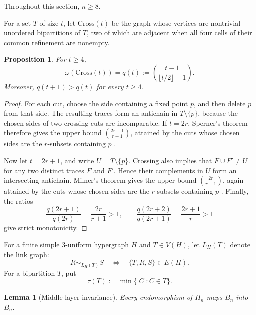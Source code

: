\documentclass[11pt]{article}
\newtheorem{lemma}[theorem]{Lemma}
\newtheorem{proposition}[theorem]{Proposition}
\begin{document}
Throughout this section, \(n\ge8\).

For a set \(T\) of size \(t\), let \(\mathrm{Cross}(t)\) be the graph whose
vertices are nontrivial unordered bipartitions of \(T\), two of which are
adjacent when all four cells of their common refinement are nonempty.

\begin{proposition}\label{prop:cross}
For \(t\ge4\),
\[
\omega(\mathrm{Cross}(t))
=q(t):=\binom{t-1}{\lfloor t/2\rfloor-1}.
\]
Moreover, \(q(t+1)>q(t)\) for every \(t\ge4\).
\end{proposition}

\begin{proof}
For each cut, choose the side containing a fixed point \(p\), and then delete
\(p\) from that side.  The resulting traces form an antichain in
\(T\setminus\{p\}\), because the chosen sides of two crossing cuts are
incomparable.  If \(t=2r\), Sperner's theorem therefore gives the upper bound
\(\binom{2r-1}{r-1}\), attained by the cuts whose chosen sides are the
\(r\)-subsets containing \(p\) \cite{Sperner1928}.

Now let \(t=2r+1\), and write \(U=T\setminus\{p\}\).  Crossing also implies
that \(F\cup F'\ne U\) for any two distinct traces \(F\) and \(F'\).  Hence their
complements in \(U\) form an intersecting antichain.  Milner's theorem gives
the upper bound \(\binom{2r}{r-1}\), again attained by the cuts whose chosen
sides are the \(r\)-subsets containing \(p\) \cite{Milner1968}.  Finally, the
ratios
\[
\frac{q(2r+1)}{q(2r)}=\frac{2r}{r+1}>1,
\qquad
\frac{q(2r+2)}{q(2r+1)}=\frac{2r+1}{r}>1
\]
give strict monotonicity.
\end{proof}

For a finite simple \(3\)-uniform hypergraph \(H\) and \(T\in V(H)\), let
\(L_H(T)\) denote the link graph:
\[
R\sim_{L_H(T)}S
\quad\Longleftrightarrow\quad
\{T,R,S\}\in E(H).
\]
For a bipartition \(T\), put
\[
\tau(T):=\min\{|C|:C\in T\}.
\]

\begin{lemma}[Middle-layer invariance]\label{lem:middle-invariant}
Every endomorphism of \(H_n\) maps \(B_n\) into \(B_n\).
\end{lemma}
\end{document}
